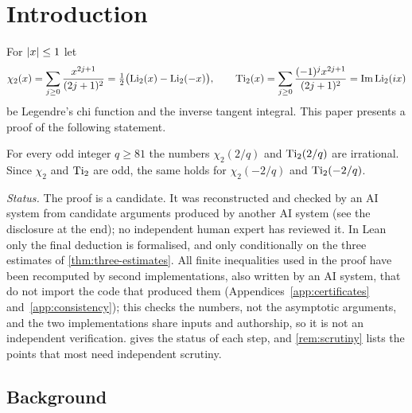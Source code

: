 \section{Introduction}\label{sec:introduction}

For $\left\lvert x\right\rvert\le 1$ let
\[
  \chi_2(x)=\sum_{j\ge0}\frac{x^{2j+1}}{(2j+1)^2}=\tfrac12\bigl(\operatorname{Li}_2(x)-\operatorname{Li}_2(-x)\bigr),
  \qquad
  \operatorname{Ti}_2(x)=\sum_{j\ge0}\frac{(-1)^jx^{2j+1}}{(2j+1)^2}=\operatorname{Im}\operatorname{Li}_2(ix)
\]
be Legendre's chi function and the inverse tangent integral. This paper presents a proof of the
following statement.

\begin{theorem}\label{thm:main}
For every odd integer $q\ge 81$ the numbers $\chi_2(2/q)$ and $\operatorname{Ti}_2(2/q)$ are irrational.
Since $\chi_2$ and $\operatorname{Ti}_2$ are odd, the same holds for $\chi_2(-2/q)$ and $\operatorname{Ti}_2(-2/q)$.
\end{theorem}

\emph{Status.} The proof is a candidate. It was reconstructed and checked by an AI system from
candidate arguments produced by another AI system (see the disclosure at the end); no
independent human expert has reviewed it. In Lean only the final deduction is formalised, and
only conditionally on the three estimates of \cref{thm:three-estimates}. All finite
inequalities used in the proof have been recomputed by second implementations, also written by an
AI system, that do not import the code that produced them (Appendices~\ref{app:certificates}
and~\ref{app:consistency}); this checks the numbers, not the asymptotic arguments, and the two
implementations share inputs and authorship, so it is not an independent verification.  gives the status of each
step, and \cref{rem:scrutiny} lists the points that most need independent scrutiny.

\subsection{Background}\label{subsec:background}

